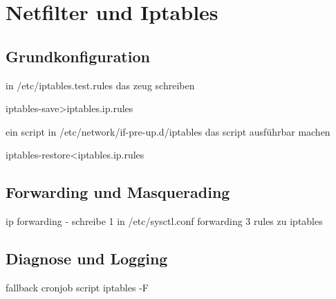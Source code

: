 \chapter{Netfilter und Iptables}
\section{Grundkonfiguration}
in /etc/iptables.test.rules das zeug schreiben

iptables-save>iptables.ip.rules

ein script in /etc/network/if-pre-up.d/iptables
das script ausführbar machen

iptables-restore<iptables.ip.rules


\section{Forwarding und Masquerading}
ip  forwarding - schreibe 1 in /etc/sysctl.conf forwarding
3 rules zu iptables

\section{Diagnose und Logging}
fallback cronjob script iptables -F
